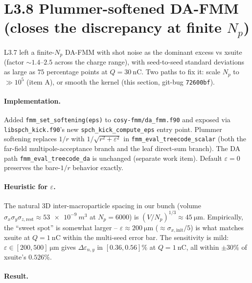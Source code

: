 \documentclass[11pt]{article}
\begin{document}
\section{L3.8 Plummer-softened DA-FMM (closes the discrepancy at finite $N_p$)}

L3.7 left a finite-$N_p$ DA-FMM with shot noise as the dominant excess
vs xsuite (factor $\sim 1.4$--$2.5$ across the charge range), with
seed-to-seed standard deviations as large as $75$ percentage points at
$Q=\SI{30}{\nano\coulomb}$. Two paths to fix it: scale $N_p$ to $\gg 10^5$
(item A), or smooth the kernel (this section, git-bug
\texttt{72600bf}).

\paragraph{Implementation.}
Added \texttt{fmm\_set\_softening(eps)} to \texttt{cosy-fmm/da\_fmm.f90}
and exposed via \texttt{libspch\_kick.f90}'s new
\texttt{spch\_kick\_compute\_eps} entry point. Plummer softening
replaces $1/r$ with $1/\sqrt{r^2 + \varepsilon^2}$ in
\texttt{fmm\_eval\_treecode\_scalar} (both the far-field
multipole-acceptance branch and the leaf direct-sum branch). The DA
path \texttt{fmm\_eval\_treecode\_da} is unchanged (separate work
item). Default $\varepsilon = 0$ preserves the bare-$1/r$ behavior
exactly.

\paragraph{Heuristic for $\varepsilon$.}
The natural 3D inter-macroparticle spacing in our bunch (volume
$\sigma_x \sigma_y \sigma_{z,\mathrm{rest}} \approx \SI{53e-9}{m^3}$ at
$N_p=6000$) is
$(V/N_p)^{1/3} \approx \SI{45}{\micro\meter}$. Empirically, the
``sweet spot'' is somewhat larger -- $\varepsilon \approx \SI{200}{\micro\meter}$
($\approx \sigma_{x,\mathrm{init}}/5$) is what matches xsuite at
$Q=\SI{1}{\nano\coulomb}$ within the multi-seed error bar. The
sensitivity is mild: $\varepsilon \in [200, 500]~\mathrm{\mu m}$ gives
$\Delta\varepsilon_{n,y}$ in $[0.36, 0.56]\%$ at $Q=\SI{1}{\nano\coulomb}$,
all within $\pm 30\%$ of xsuite's $0.526\%$.

\paragraph{Result.}
\end{document}
